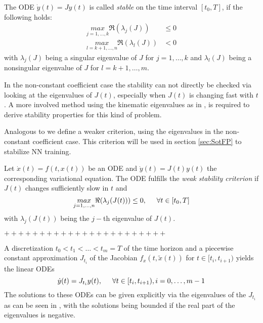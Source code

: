 \documentclass[a4paper, 12pt]{scrreprt} %
\begin{document}
\begin{definition}[Stability]
The \ac{ODE} $\dot{y}(t) = J y(t)$ is called \emph{stable} on the time interval $[t_0,T]$, if the following holds:
\begin{align}
\underset{j=1,\dots,k}{max} \Re (\lambda_j(J)) &\leq  0 \\
\underset{l=k+1,\dots,n}{max} \Re (\lambda_l(J)) &<  0
\label{eq:stab2}
\end{align}
with $\lambda_j(J)$ being a singular eigenvalue of $J$ for $j=1,\dots,k$ and $\lambda_l(J)$ being a nonsingular eigenvalue of $J$ for $l=k+1,\dots,m$.
\end{definition}

In the non-constant coefficient case the stability can not directly be checked via looking at the eigenvalues of $J(t)$, especially when $J(t)$ is changing fast with $t$. A more involved method using the kinematic eigenvalues as in \cite{nsobvpfode}, is required to derive stability properties for this kind of problem. 

Analogous to \cite{safdnn} we define a weaker criterion, using the eigenvalues in the non-constant coefficient case. This criterion will be used in section \ref{sec:SotFP} to stabilize \ac{NN} training.

\begin{definition}
Let $\dot x(t) = f\left(t,x(t)\right)$ be an \ac{ODE} and $\dot{y}(t) = J(t) y(t)$ the corresponding variational equation. The \ac{ODE} fulfills the \emph{weak stability criterion} if $J(t)$ changes sufficiently slow in $t$ and
\begin{equation}
\underset{j=1,\dots,n}{max} \Re (\lambda_j(J(t))) \leq  0, \hspace{0.5cm} \forall t\in[t_0,T]
\label{eq:wstabcrit}
\end{equation}
with $\lambda_j(J(t))$ being the $j-$th eigenvalue of $J(t)$.
\end{definition}

\iffalse
$+++++++++++++++++++++++$

A discretization $t_0 < t_1 < \dots < t_m = T$ of the time horizon and a piecewise constant approximation $J_{t_i}$ of the Jacobian $f_x(t,\tilde{x}(t))$ for $t \in [t_i,t_{i+1})$ yields the linear \acp{ODE} 
\begin{equation*}
\dot y(t) = J_{t_i} y(t), \hspace{0.5cm} \forall t \in [t_i, t_{i+1}), i = 0, \dots, m-1
\end{equation*}
The solutions to these \acp{ODE} can be given explicitly via the eigenvalues of the $J_{t_i}$ as can be seen in \cite{sodei}, with the solutions being bounded if the real part of the eigenvalues is negative. 
\end{document}
